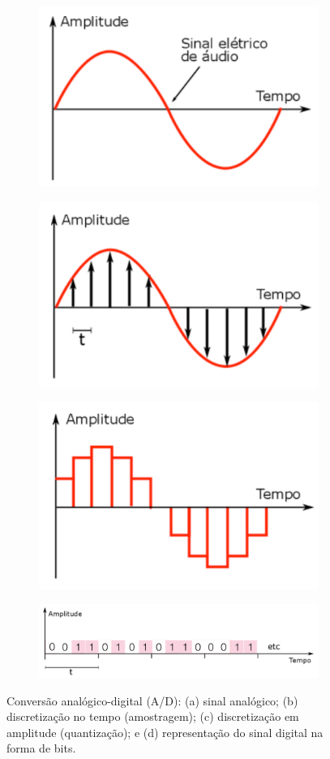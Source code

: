 \begin{figure}[H] 
  \centering 
  \begin{subfigure}{.33\textwidth}
    \centering
    \includegraphics[width=.5\textwidth]{imagens/pdf_images/a.png}
    \caption{}
    \label{fig:a_sf}
  \end{subfigure}
  \begin{subfigure}{.33\textwidth}
    \centering
    \includegraphics[width=.5\textwidth]{imagens/pdf_images/b.png}
    \caption{}
    \label{fig:b_sf}
  \end{subfigure}
  \begin{subfigure}{.33\textwidth}
    \centering
    \includegraphics[width=.5\textwidth]{imagens/pdf_images/c.png}
    \caption{}
    \label{fig:c_sf}
  \end{subfigure}
  
  \begin{subfigure}{.33\textwidth}
    \centering
    \includegraphics[width=1.3\textwidth]{imagens/pdf_images/d.png}
    \caption{}
    \label{fig:d_sf}
  \end{subfigure}
  
  
  \caption{Conversão analógico-digital (A/D): (a) sinal analógico; (b) discretização no tempo (amostragem); (c) discretização em amplitude (quantização); e (d) representação do sinal digital na forma de bits.}
  \label{fig:fig1}
\end{figure}

